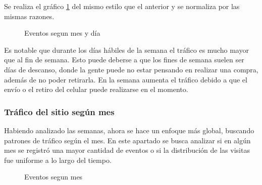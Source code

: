 \documentclass[a4paper]{article}
\begin{document}
Se realiza el gráfico \ref{fig:messemanasnormalizado} del mismo estilo que el anterior y se normaliza por las mismas razones.

\begin{figure}[!h]
	\caption{Eventos segun mes y día}
	\label{fig:messemanasnormalizado}
\end{figure}

Es notable que durante los días hábiles de la semana el tráfico es mucho mayor que al fin de semana. Esto puede deberse a que los fines de semana suelen ser días de descanso, donde la gente puede no estar pensando en realizar una compra, además de no poder retirarla. En la semana aumenta el tráfico debido a que el envío o el retiro del celular puede realizarse en el momento.

\subsubsection{Tráfico del sitio según mes}

Habiendo analizado las semanas, ahora se hace un enfoque más global, buscando patrones de tráfico según el mes. En este apartado se busca analizar si en algún mes se registró una mayor cantidad de eventos o si la distribución de las visitas fue uniforme a lo largo del tiempo.

\begin{figure}[!h]
	\caption{Eventos segun mes}
	\label{fig:mes}
\end{figure}
\end{document}
